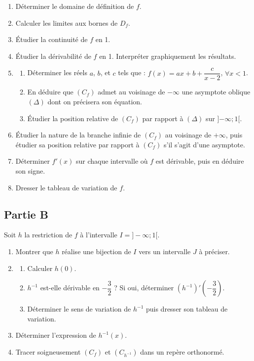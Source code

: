 \documentclass[12pt,a4paper]{article}
\begin{document}
\begin{enumerate}
    \item Déterminer le domaine de définition de $f$.
    \item Calculer les limites aux bornes de $D_f$.
    \item Étudier la continuité de $f$ en 1.
    \item Étudier la dérivabilité de $f$ en 1. Interpréter graphiquement les résultats.
    \item 
    \begin{enumerate}
        \item Déterminer les réels $a$, $b$, et $c$ tels que : $f(x) = ax + b + \dfrac{c}{x-2}$, $\forall x < 1$.
        \item En déduire que $(C_f)$ admet au voisinage de $-\infty$ une asymptote oblique $(\Delta)$ dont on précisera son équation.
        \item Étudier la position relative de $(C_f)$ par rapport à $(\Delta)$ sur ]$-\infty ; 1[$.
    \end{enumerate}
    \item Étudier la nature de la branche infinie de $(C_f)$ au voisinage de $+\infty$, puis étudier sa position relative par rapport à $(C_f)$ s'il s'agit d'une asymptote.
    \item Déterminer $f'(x)$ sur chaque intervalle où $f$ est dérivable, puis en déduire son signe.
    \item Dresser le tableau de variation de $f$.
\end{enumerate}

\subsection*{Partie B}


Soit $h$ la restriction de $f$ à l’intervalle $I = ]-\infty; 1[$.
\begin{enumerate}
    \item Montrer que $h$ réalise une bijection de $I$ vers un intervalle $J$ à préciser.
    \item 
    \begin{enumerate}
        \item Calculer $h(0)$.
        \item $h^{-1}$ est-elle dérivable en $-\dfrac{3}{2}$ ? Si oui, déterminer $(h^{-1})'\left(-\dfrac{3}{2}\right)$.
        \item Déterminer le sens de variation de $h^{-1}$ puis dresser son tableau de variation.
    \end{enumerate}
    \item Déterminer l’expression de $h^{-1}(x)$.
    \item Tracer soigneusement $(C_f)$ et $(C_{h^{-1}})$ dans un repère orthonormé.
\end{enumerate}
\end{document}
